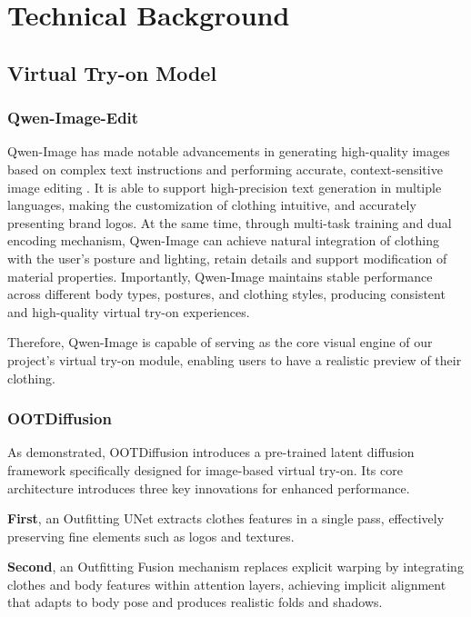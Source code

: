\chapter{Technical Background}
\label{ch:technical_background}

\section{Virtual Try-on Model}
\subsection{Qwen-Image-Edit}
Qwen-Image has made notable advancements in generating high-quality images based on complex text instructions and performing accurate, context-sensitive image editing \citep{wu2025qwenimage}. It is able to support high-precision text generation in multiple languages, making the customization of clothing intuitive, and accurately presenting brand logos. At the same time, through multi-task training and dual encoding mechanism,  Qwen-Image can achieve natural integration of clothing with the user's posture and lighting, retain details and support modification of material properties. Importantly, Qwen-Image maintains stable performance across different body types, postures, and clothing styles, producing consistent and high-quality virtual try-on experiences. 


\noindent Therefore, Qwen-Image is capable of serving as the core visual engine of our project's virtual try-on module, enabling users to have a realistic preview of their clothing.


\subsection{OOTDiffusion}
As \cite{xu2025ootddiffusion} demonstrated, OOTDiffusion introduces a pre-trained latent diffusion framework specifically designed for image-based virtual try-on. Its core architecture introduces three key innovations for enhanced performance.

\textbf{First}, an Outfitting UNet extracts clothes features in a single pass, effectively preserving fine elements such as logos and textures.

\textbf{Second}, an Outfitting Fusion mechanism replaces explicit warping by integrating clothes and body features within attention layers, achieving implicit alignment that adapts to body pose and produces realistic folds and shadows.

